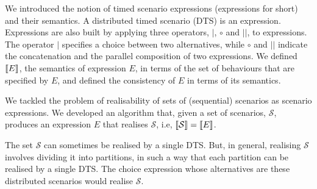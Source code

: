 We introduced the notion of timed scenario expressions (expressions for
short) and their semantics.
A distributed timed scenario (DTS) is an expression.
Expressions are also built by applying three operators, $|$, $\circ$ and $||$, to
expressions. The operator
$|$ specifies a choice between two alternatives, while $\circ$ and
$||$ indicate the concatenation and the parallel composition of two
expressions.
We defined $\llbracket E \rrbracket$, the semantics of expression $E$,
in terms of the set of behaviours that are
specified by $E$, and defined the consistency of $E$ in
terms of its semantics.



We tackled the problem of realisability of sets of (sequential)
scenarios as scenario expressions.
We developed an algorithm that, given a set of scenarios,
$\mathcal{S}$, produces an expression $E$ that realises
$\mathcal{S}$, i.e, $\llbracket \mathcal{S} \rrbracket=\llbracket E \rrbracket$.

The set $\mathcal{S}$ can sometimes be realised by a single
DTS. But, in general, realising $\mathcal{S}$
involves dividing it into partitions, in such a way that each
partition can be realised by a single DTS. The
choice expression whose alternatives are these distributed
scenarios would realise $\mathcal{S}$.



